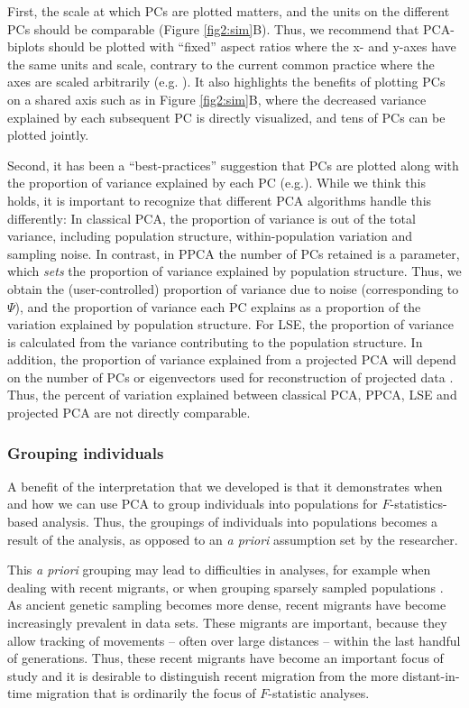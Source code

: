 \documentclass[12pt]{article}
\begin{document}
First, the scale at which PCs are plotted matters, and the units on the different PCs should be comparable (Figure \ref{fig2:sim}B). Thus, we recommend that PCA-biplots should be plotted with ``fixed'' aspect ratios where the x- and y-axes have the same units and scale, contrary to the current common practice where the axes are scaled arbitrarily (e.g. \cite{novembre_genes_2008, peter_genetic_2020}). It also highlights the benefits of plotting PCs on a shared axis such as in Figure \ref{fig2:sim}B, where the decreased variance explained by each subsequent PC is directly visualized, and tens of PCs can be plotted jointly.

Second, it has been a ``best-practices'' suggestion that PCs are plotted along with the proportion of variance explained by each PC (e.g.\citep{novembre_recent_2016, elhaik_principal_2022}). While we think this holds, it is important to recognize that different PCA algorithms handle this differently: In classical PCA, the proportion of variance is out of the total variance, including population structure, within-population variation and sampling noise. In contrast, in PPCA the number of PCs retained is a parameter, which \emph{sets} the proportion of variance explained by population structure. Thus, we obtain the (user-controlled) proportion of variance due to noise (corresponding to $\Psi$), and the proportion of variance each PC explains as a proportion of the variation explained by population structure. For LSE, the proportion of variance is calculated from the variance contributing to the population structure. In addition, the proportion of variance explained from a projected PCA will depend on the number of PCs or eigenvectors used for reconstruction of projected data \citep{patterson_population_2006}. 
Thus, the percent of variation explained between classical PCA, PPCA, LSE and projected PCA are not directly comparable.

\subsubsection{Grouping individuals}
A benefit of the interpretation that we developed is that it demonstrates when and how we can use PCA to group individuals into populations for $F$-statistics-based analysis. 
Thus, the groupings of individuals into populations becomes a result of the analysis, as opposed to an \textit{a priori} assumption set by the researcher.

This \textit{a priori} grouping may lead to difficulties in analyses, for example when dealing with recent migrants, or when grouping sparsely sampled populations \citep{shringarpure_effects_2014}. As ancient genetic sampling becomes more dense, recent migrants have become increasingly prevalent in data sets. These migrants are important, because they allow tracking of movements -- often over large distances -- within the last handful of generations. Thus, these recent migrants have become an important focus of study and it is desirable to distinguish recent migration from the more distant-in-time migration that is ordinarily the focus of $F$-statistic analyses.
\end{document}
